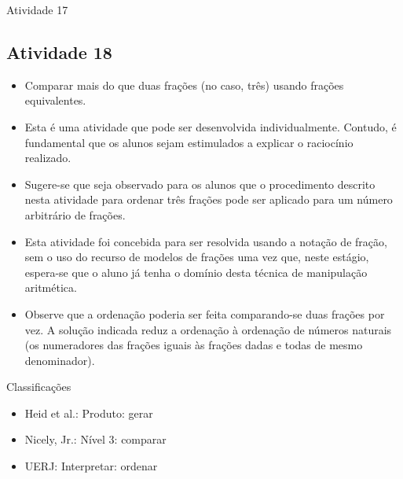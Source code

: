 \documentclass[oneside]{book}
\begin{document}
\begin{multicols}{2}
\begin{resposta*}{Atividade 17}
\end{resposta*}



\subsection{Atividade 18}
  
\begin{itemize} %
    \item       Comparar mais do que duas frações (no caso, três) usando frações 
equivalentes.
\end{itemize} %
  
  
 
\begin{itemize} %
    \item       Esta é uma atividade que pode ser desenvolvida individualmente. 
Contudo, é fundamental que os alunos sejam estimulados a explicar o raciocínio 
realizado.
    \item       Sugere-se que seja observado para os alunos que o procedimento 
descrito nesta atividade para ordenar três frações pode ser aplicado para um 
número arbitrário de frações.
    \item       Esta atividade foi concebida para ser resolvida usando a notação 
de fração, sem o uso do recurso de modelos de frações uma vez que, neste 
estágio, espera-se que o aluno já tenha o domínio desta técnica de manipulação 
aritmética.
    \item       Observe que a ordenação poderia ser feita comparando-se duas 
frações por vez. A solução indicada reduz a ordenação à ordenação de números 
naturais (os numeradores das frações iguais às frações dadas e todas de mesmo 
denominador).
\end{itemize} %
  
  
  Classificações  
\begin{itemize} %
    \item       Heid et al.: Produto: gerar
    \item       Nicely, Jr.: Nível 3: comparar
    \item       UERJ: Interpretar: ordenar
\end{itemize} %
  

\end{multicols}
\end{document}
